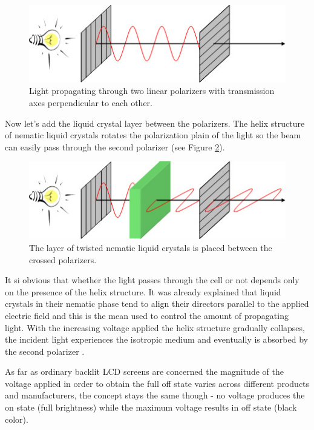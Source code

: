 \begin{figure}[hbt]
\centering
\includegraphics[width=12cm]{img/pol_crossed.jpg}
\caption{Light propagating through two linear polarizers with transmission axes perpendicular to each other. \cite{Desimpel2006polarizersCrossed}}
\label{fig:polarizersCrossed}
\end{figure}

Now let's add the liquid crystal layer between the polarizers. The helix structure of nematic liquid crystals rotates the polarization plain of the light so the beam can easily pass through the second polarizer
(see Figure \ref{fig:polarizersLc}).

\begin{figure}[hbt]
\centering
\includegraphics[width=12cm]{img/pol_lc.jpg}
\caption{The layer of twisted nematic liquid crystals is placed between the crossed polarizers. \cite{Desimpel2006polarizersCrossed}}
\label{fig:polarizersLc}
\end{figure}

It si obvious that whether the light passes through the cell or not depends only on the presence of the helix structure. It was already explained that liquid crystals in their nematic phase tend to align their directors parallel to the applied electric field and this is the mean used to control the amount of propagating light. With the increasing voltage applied the helix structure gradually collapses, the incident light experiences the isotropic medium and eventually is absorbed by the second polarizer \cite{Desimpel2006LCD}.

As far as ordinary backlit LCD screens are concerned the magnitude of the voltage applied in order to obtain the full off state varies across different products and manufacturers, the concept stays the same though - no voltage produces the on state (full brightness) while the maximum voltage results in off state (black color).


